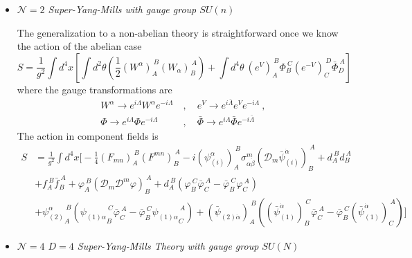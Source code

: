 \documentclass[a4paper,12pt]{article}
\numberwithin{equation}{section}
\numberwithin{exe}{section}
\newcommand{\Dc}{{\mathcal D}}
\renewcommand{\a}{{\alpha}}
\newcommand{\ad}{{\dot\alpha}}
\newcommand{\bd}{{\dot\beta}}
\renewcommand{\L}{{\Lambda}}
\newcommand{\Lb}{{\bar\Lambda}}
\newcommand{\s}{{\sigma}}
\renewcommand{\t}{{\theta}}
\newcommand{\vphi}{{\varphi}}
\newcommand{\vphib}{{\bar\varphi}}
\newcommand{\Phib}{{\bar \Phi}}
\newcommand{\psib}{{\bar\psi}}
\begin{document}
\begin{itemize}
	\item {\it $\mathcal N=2$ Super-Yang-Mills with gauge group $SU(n)$}
	
	The generalization to a non-abelian theory is straightforward once we know the action of the abelian case
	\begin{equation}
	S = \frac{1}{g^2} \int d^4x \left[ \int d^2\t\left(\frac12 (W^\a)_A^{\ B}(W_\a)_B^{\ A}\right) + \int d^4\t\ (e^V)_A^{\ B}\Phi_B^{\ C}(e^{-V})_C^{\ D}\Phib_D^{\ A} \right]
	\end{equation}
where the gauge transformations are
	\begin{equation}
		\begin{aligned}
		W^\a \rightarrow e^{i\L}W^\a e^{-i\L}\ &,\quad e^V \rightarrow e^{i\Lb} e^V e^{-i\L}\ ,\\
		\Phi\rightarrow e^{i\L}\Phi e^{-i\L}\ &,\quad \Phib \rightarrow e^{i\L}\Phib e^{-i\Lb}
		\end{aligned}
	\end{equation}
	The action in component fields is
	\begin{align}
	S & = \frac{1}{g^2} \int d^4x  \Big[ -\frac14 (F_{mn})_A^{\ B} (F^{mn})_B^{\ A} - i(\psi^\a_{(i)})_A^{\ B}\s^m_{\a\bd}(\Dc_m\psib_{(i)}^\ad)_B^{\ A} + d_A^{\ B} d_B^{\ A} \nonumber \\
	&  + f_A^{\ B} \bar f_B^{\ A} + \vphi_A^{\ B} (\Dc_m\Dc^m\vphi)_B^{\ A} + d_A^{\ B} (\vphi_B^{\ C}\vphib_C^{\ A} - \vphib_B^{\ C} \vphi_C^{\ A}) \nonumber \\
	& + {\psi^\a_{(2)}}_A^{\ B} ({\psi_{(1)\a}}_B^{\ C}\vphib_C^{\ A} - \vphib_B^{\ C} {\psi_{(1)\a}}_C^{\ A}) +  (\psib_{(2)\ad})_A^{\ B} ((\psib^\ad_{(1)})_B^{\ C}\vphib_C^{\ A} - \vphib_B^{\ C} (\psib^\ad_{(1)})_C^{\ A}) \Big]
	\end{align}
	
	\item {\it $\mathcal N=4$ $D=4$ Super-Yang-Mills Theory with gauge group $SU(N)$}
	

\end{itemize}
\end{document}
